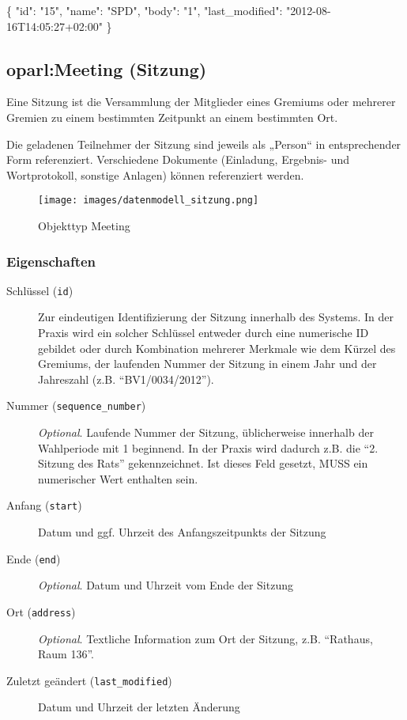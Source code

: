 \documentclass[,a4paper]{article}
\makeatletter
\newenvironment{Shaded}{}{}
\newcommand{\DataTypeTok}[1]{\textcolor[rgb]{0.56,0.13,0.00}{{#1}}}
\newcommand{\StringTok}[1]{\textcolor[rgb]{0.25,0.44,0.63}{{#1}}}
\newcommand{\NormalTok}[1]{{#1}}
\def\maxwidth{\ifdim\Gin@nat@width>\linewidth\linewidth
\else\Gin@nat@width\fi}
\let\Oldincludegraphics\includegraphics
\renewcommand{\includegraphics}[1]{\Oldincludegraphics[width=\maxwidth]{#1}}
\makeatother
\begin{document}
\begin{Shaded}
\begin{Highlighting}[]
\NormalTok{\{}
    \DataTypeTok{"id"}\NormalTok{: }\StringTok{"15"}\NormalTok{,}
    \DataTypeTok{"name"}\NormalTok{: }\StringTok{"SPD"}\NormalTok{,}
    \DataTypeTok{"body"}\NormalTok{: }\StringTok{"1"}\NormalTok{,}
    \DataTypeTok{"last_modified"}\NormalTok{: }\StringTok{"2012-08-16T14:05:27+02:00"}
\NormalTok{\}}
\end{Highlighting}
\end{Shaded}

\subsection{oparl:Meeting (Sitzung)}

Eine Sitzung ist die Versammlung der Mitglieder eines Gremiums oder
mehrerer Gremien zu einem bestimmten Zeitpunkt an einem bestimmten Ort.

Die geladenen Teilnehmer der Sitzung sind jeweils als „Person`` in
entsprechender Form referenziert. Verschiedene Dokumente (Einladung,
Ergebnis- und Wortprotokoll, sonstige Anlagen) können referenziert
werden.

\begin{figure}[htbp]
\centering
\texttt{[image: images/datenmodell\_sitzung.png]}
\caption{Objekttyp Meeting}
\end{figure}

\subsubsection{Eigenschaften}

\begin{description}
\item[Schlüssel (\texttt{id})]
Zur eindeutigen Identifizierung der Sitzung innerhalb des Systems. In
der Praxis wird ein solcher Schlüssel entweder durch eine numerische ID
gebildet oder durch Kombination mehrerer Merkmale wie dem Kürzel des
Gremiums, der laufenden Nummer der Sitzung in einem Jahr und der
Jahreszahl (z.B. ``BV1/0034/2012'').
\item[Nummer (\texttt{sequence\_number})]
\emph{Optional}. Laufende Nummer der Sitzung, üblicherweise innerhalb
der Wahlperiode mit 1 beginnend. In der Praxis wird dadurch z.B. die
``2. Sitzung des Rats'' gekennzeichnet. Ist dieses Feld gesetzt, MUSS
ein numerischer Wert enthalten sein.
\item[Anfang (\texttt{start})]
Datum und ggf. Uhrzeit des Anfangszeitpunkts der Sitzung
\item[Ende (\texttt{end})]
\emph{Optional}. Datum und Uhrzeit vom Ende der Sitzung
\item[Ort (\texttt{address})]
\emph{Optional}. Textliche Information zum Ort der Sitzung, z.B.
``Rathaus, Raum 136''.
\item[Zuletzt geändert (\texttt{last\_modified})]
Datum und Uhrzeit der letzten Änderung
\end{description}
\end{document}
